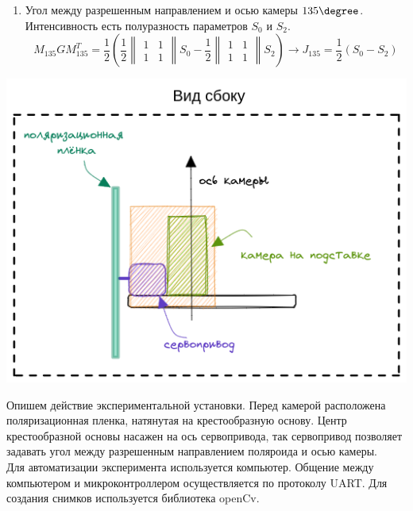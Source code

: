 \documentclass[a4paper]{article}
\begin{document}
\begin{enumerate}
\item Угол между разрешенным направлением и осью камеры $135 \degree$. Интенсивность есть полуразность параметров $S_{0}$ и $S_{2}$.
\begin{equation}
    M_{135} G M_{135}^{T} =
    \frac{1}{2} \left(
    \frac{1}{2}
    \begin{Vmatrix}
        1 & 1 \\
        1 & 1
    \end{Vmatrix} S_{0} -
    \frac{1}{2}
      \begin{Vmatrix}
        1 & 1 \\
        1 & 1
    \end{Vmatrix} S_{2} 
    \right)
    \to 
    J_{135} = \frac{1}{2} (S_{0} - S_{2})
    \label{135_polaroid_on_G}
\end{equation}
\end{enumerate}

\begin{minipage}{0.6\textwidth}%

\includegraphics[width= \linewidth]{Experimental_setup.excalidraw.png}

\end{minipage}%
\hfill%
\begin{minipage}{0.4\textwidth}\raggedright
Опишем действие экспериментальной установки. Перед камерой расположена поляризационная пленка, натянутая на крестообразную основу. Центр крестообразной основы насажен на ось сервопривода, так сервопривод позволяет задавать угол между разрешенным направлением поляроида и осью камеры.
\\
Для автоматизации эксперимента используется компьютер. Общение между компьютером и микроконтроллером осуществляется по протоколу UART. Для создания снимков используется библиотека openCv.
\end{minipage}
\end{document}
